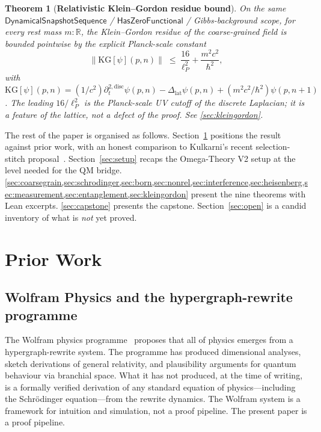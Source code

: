 \documentclass[11pt,a4paper,twoside]{article}
\newtheorem{theorem}{Theorem}[section]
\theoremstyle{definition}
\newcommand{\Rbb}{\mathbb{R}}
\newcommand{\lP}{\ell_P}
\newcommand{\HasZF}{\mathsf{HasZeroFunctional}}
\newcommand{\DynSeq}{\mathsf{DynamicalSnapshotSequence}}
\begin{document}
\begin{theorem}[\textbf{Relativistic Klein--Gordon
  residue bound}]\label{thm:T9-informal}
On the same $\DynSeq$ / $\HasZF$ / Gibbs-background scope, for every
rest mass $m:\Rbb$, the Klein--Gordon residue of the coarse-grained
field is bounded pointwise by the explicit Planck-scale constant
\[
\bigl\|\mathrm{KG}[\psi](p, n)\bigr\|
 \;\le\; \frac{16}{\lP^{2}} + \frac{m^{2} c^{2}}{\hbar^{2}},
\]
with $\mathrm{KG}[\psi](p, n) = (1/c^{2}) \partial_{t}^{2,\mathrm{disc}}\psi(p, n) - \Delta_{\mathrm{lat}}\psi(p, n) + (m^{2} c^{2}/\hbar^{2})\psi(p, n+1)$.
The leading $16/\lP^{2}$ is the Planck-scale UV cutoff of the
discrete Laplacian; it is a feature of the lattice, not a defect of
the proof. See \cref{sec:kleingordon}.
\end{theorem}

The rest of the paper is organised as follows. Section~\ref{sec:prior}
positions the result against prior work, with an honest comparison to
Kulkarni's recent selection-stitch proposal~\cite{Kulkarni2026}.
Section~\ref{sec:setup} recaps the Omega-Theory V2 setup at the level
needed for the QM bridge. \cref{sec:coarsegrain,sec:schrodinger,sec:born,sec:nonrel,sec:interference,sec:heisenberg,sec:measurement,sec:entanglement,sec:kleingordon}
present the nine theorems with Lean excerpts.
\cref{sec:capstone} presents the capstone.
Section~\ref{sec:open} is a candid inventory of what is \emph{not} yet
proved.

\section{Prior Work}\label{sec:prior}

\subsection{Wolfram Physics and the hypergraph-rewrite programme}\label{sec:prior-wolfram}

The Wolfram physics programme~\cite{Wolfram2020} proposes that all of
physics emerges from a hypergraph-rewrite system. The programme has
produced dimensional analyses, sketch derivations of general
relativity, and plausibility arguments for quantum behaviour via
branchial space. What it has not produced, at the time of writing, is
a formally verified derivation of any standard equation of
physics---including the Schr\"odinger equation---from the rewrite
dynamics. The Wolfram system is a framework for intuition and
simulation, not a proof pipeline. The present paper is a proof
pipeline.
\end{document}
